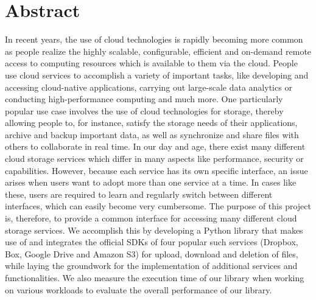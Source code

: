 \section*{Abstract}
In recent years, the use of cloud technologies is rapidly becoming more common as people realize the highly scalable, configurable, efficient and on-demand remote access to computing resources which is available to them via the cloud. People use cloud services to accomplish a variety of important tasks, like developing and accessing cloud-native applications, carrying out large-scale data analytics or conducting high-performance computing and much more. One particularly popular use case involves the use of cloud technologies for storage, thereby allowing people to, for instance, satisfy the storage needs of their applications, archive and backup important data, as well as synchronize and share files with others to collaborate in real time. In our day and age, there exist many different cloud storage services which differ in many aspects like performance, security or capabilities. However, because each service has its own specific interface, an issue arises when users want to adopt more than one service at a time. In cases like these, users are required to learn and regularly switch between different interfaces, which can easily become very cumbersome. The purpose of this project is, therefore, to provide a common interface for accessing many different cloud storage services. We accomplish this by developing a Python library that makes use of and integrates the official SDKs of four popular such services (Dropbox, Box, Google Drive and Amazon S3) for upload, download and deletion of files, while laying the groundwork for the implementation of additional services and functionalities. We also measure the execution time of our library when working on various workloads to evaluate the overall performance of our library.
